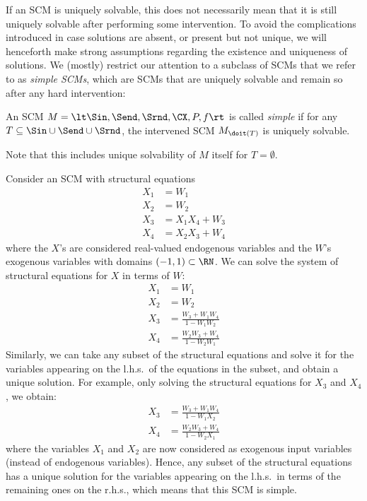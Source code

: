 If an SCM is uniquely solvable, this does not necessarily mean that it is still uniquely solvable
after performing some intervention. 
To avoid the complications introduced in case solutions are absent, or present but not unique,
we will henceforth make strong assumptions regarding the existence and uniqueness of solutions. 
We (mostly) restrict our attention to a subclass of SCMs that we refer to as \emph{simple SCMs},
which are SCMs that are uniquely solvable and remain so after any hard intervention:
\begin{Def}\label{def:simple_scm}
  An SCM $M = \lt \Sin, \Send, \Srnd, \CX, P, f \rt$ 
  is called \emph{simple} if for any $T \subseteq \Sin \cup \Send \cup \Srnd$, the intervened SCM
  $M_{\doit(T)}$ is uniquely solvable.
\end{Def}
Note that this includes unique solvability of $M$ itself for $T = \emptyset$.

\begin{Eg}
Consider an SCM with structural equations
  \begin{align*}
    X_1 &= W_1 \\
    X_2 &= W_2 \\
    X_3 &= X_1 X_4 + W_3 \\
    X_4 &= X_2 X_3 + W_4 
  \end{align*}
where the $X$'s are considered real-valued endogenous variables and the $W$'s exogenous variables with domains $(-1,1) \subset \RN$.
We can solve the system of structural equations for $X$ in terms of $W$:
  \begin{align*}
    X_1 &= W_1 \\
    X_2 &= W_2 \\
    X_3 &= \frac{W_3 + W_1 W_4}{1 - W_1 W_2} \\
    X_4 &= \frac{W_2 W_3 + W_4}{1 - W_2 W_1}
  \end{align*}
Similarly, we can take any subset of the structural equations and solve it for the variables appearing on the l.h.s.\ of the equations in the subset, and obtain a unique solution. For example, only solving the structural equations for $X_3$ and $X_4$, we obtain:
  \begin{align*}
    X_3 &= \frac{W_3 + W_1 W_4}{1 - W_1 X_2} \\
    X_4 &= \frac{W_2 W_3 + W_4}{1 - W_2 X_1}
  \end{align*}
where the variables $X_1$ and $X_2$ are now considered as exogenous input variables (instead of endogenous variables).
Hence, any subset of the structural equations has a unique solution for the variables appearing on the l.h.s.\ in terms
of the remaining ones on the r.h.s., which means that this SCM is simple.
\end{Eg}

